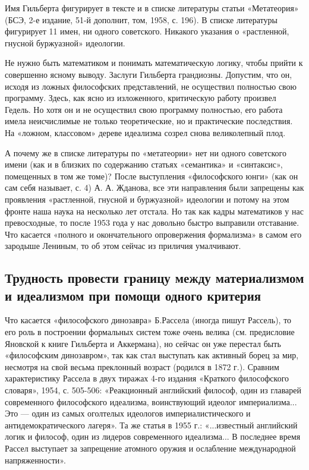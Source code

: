 Имя Гильберта фигурирует в тексте и в списке литературы статьи
«Метатеория» (БСЭ, 2-е издание, 51-й дополнит, том, 1958, с. 196). В
списке литературы фигурирует 11 имен, ни одного советского. Никакого
указания о «растленной, гнусной буржуазной» идеологии.

Не нужно быть математиком и понимать математическую логику, чтобы
прийти к совершенно ясному выводу. Заслуги Гильберта грандиозны.
Допустим, что он, исходя из ложных философских представлений, не
осуществил полностью свою программу. Здесь, как ясно из изложенного,
критическую работу произвел Гедель. Но хотя он и не осуществил свою
программу полностью, его работа имела неисчислимые не только
теоретические, но и практические последствия. На «ложном, классовом»
дереве идеализма созрел снова великолепный плод.

А почему же в списке литературы по «метатеории» нет ни одного
советского имени (как и в близких по содержанию статьях «семантика» и
«синтаксис», помещенных в том же томе)? После выступления
«философского юнги» (как он сам себя называет, с. 4) А. А. Жданова,
все эти направления были запрещены как проявления «растленной, гнусной
и буржуазной» идеологии и потому на этом фронте наша наука на
несколько лет отстала. Но так как кадры математиков у нас
превосходные, то после 1953 года у нас довольно быстро выправили
отставание. Что касается «полного и окончательного опровержения
формализма» в самом его зародыше Лениным, то об этом сейчас из
приличия умалчивают.

\subsection{Трудность провести границу между материализмом и
идеализмом при помощи одного критерия}

Что касается «философского динозавра» Б.Рассела (иногда пишут
Рассель), то его роль в построении формальных систем тоже очень велика
(см. предисловие Яновской к книге Гильберта и Аккермана), но сейчас
он уже перестал быть «философским динозавром», так как стал выступать
как активный борец за мир, несмотря на свой весьма преклонный возраст
(родился в 1872 г.). Сравним характеристику Рассела в двух тиражах
4-го издания «Краткого философского словаря», 1954, с. 505-506:
«Реакционный английский философ, один из главарей современного
философского идеализма, воинствующий идеолог империализма... Это ---
один из самых оголтелых идеологов империалистического и
антидемократического лагеря». Та же статья в 1955 г.: «...известный
английский логик и философ, один из лидеров современного идеализма...
В последнее время Рассел выступает за запрещение атомного оружия и
ослабление международной напряженности».

